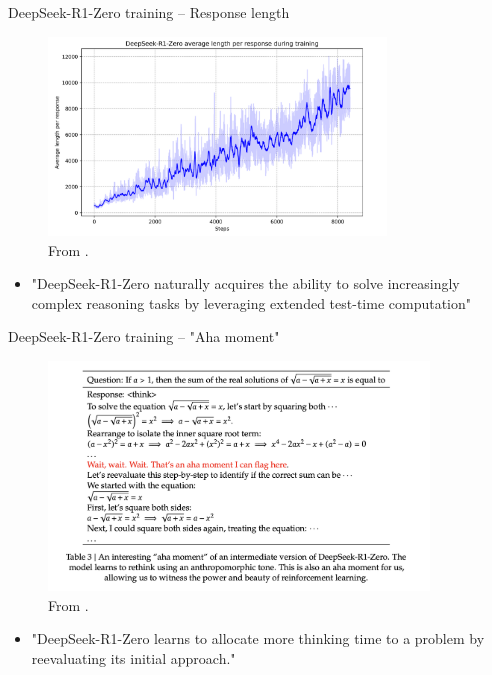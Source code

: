 \documentclass[9pt]{beamer}
\begin{document}
\begin{frame}{DeepSeek-R1-Zero training -- Response length}

  \begin{figure}
    \centering
    \includegraphics[width=0.8\textwidth]{figures/response-length.png}
    \caption{From \cite{deepseekai2025deepseekr1incentivizingreasoningcapability}.}
    \label{fig:trl8}
  \end{figure}

  \begin{itemize}
      \item "DeepSeek-R1-Zero naturally acquires the ability to solve increasingly complex reasoning tasks by leveraging extended test-time computation"
  \end{itemize}
  
\end{frame}

\begin{frame}{DeepSeek-R1-Zero training -- "Aha moment"}

  \begin{figure}
    \centering
    \includegraphics[width=0.9\textwidth]{figures/aha-moment.png}
    \caption{From \cite{deepseekai2025deepseekr1incentivizingreasoningcapability}.}
    \label{fig:trl9}
  \end{figure}

\begin{itemize}
    \item "DeepSeek-R1-Zero learns to allocate more thinking time to a problem by reevaluating its initial approach."
\end{itemize}
\end{frame}
\end{document}
